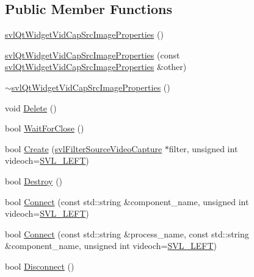 \subsection*{Public Member Functions}
\begin{DoxyCompactItemize}
\item 
\hyperlink{classsvl_qt_widget_vid_cap_src_image_properties_a0cb5bc895ddd2c84fbb9034f84c87028}{svl\-Qt\-Widget\-Vid\-Cap\-Src\-Image\-Properties} ()
\item 
\hyperlink{classsvl_qt_widget_vid_cap_src_image_properties_a8605cbcf1352874760d179154a6cef56}{svl\-Qt\-Widget\-Vid\-Cap\-Src\-Image\-Properties} (const \hyperlink{classsvl_qt_widget_vid_cap_src_image_properties}{svl\-Qt\-Widget\-Vid\-Cap\-Src\-Image\-Properties} \&other)
\item 
\hyperlink{classsvl_qt_widget_vid_cap_src_image_properties_a7fab52aa9b9bb3595d320822d1581356}{$\sim$svl\-Qt\-Widget\-Vid\-Cap\-Src\-Image\-Properties} ()
\item 
void \hyperlink{classsvl_qt_widget_vid_cap_src_image_properties_af0ddf53a66bdf0fbb8c36e7e9e13de2f}{Delete} ()
\item 
bool \hyperlink{classsvl_qt_widget_vid_cap_src_image_properties_a1741bc3973dec7677087578553a469fd}{Wait\-For\-Close} ()
\item 
bool \hyperlink{classsvl_qt_widget_vid_cap_src_image_properties_a3c09d4365eb66766c1ea48f2c7fad494}{Create} (\hyperlink{classsvl_filter_source_video_capture}{svl\-Filter\-Source\-Video\-Capture} $\ast$filter, unsigned int videoch=\hyperlink{svl_definitions_8h_ab9fec7615f19c8df2919eebcab0b187f}{S\-V\-L\-\_\-\-L\-E\-F\-T})
\item 
bool \hyperlink{classsvl_qt_widget_vid_cap_src_image_properties_a6da9ed333d5e43397ea8ecbbfa852d6e}{Destroy} ()
\item 
bool \hyperlink{classsvl_qt_widget_vid_cap_src_image_properties_aaaf4b33ea35a127de6ff9f97e67af14a}{Connect} (const std\-::string \&component\-\_\-name, unsigned int videoch=\hyperlink{svl_definitions_8h_ab9fec7615f19c8df2919eebcab0b187f}{S\-V\-L\-\_\-\-L\-E\-F\-T})
\item 
bool \hyperlink{classsvl_qt_widget_vid_cap_src_image_properties_abf7af58acabf230ed8f301f614e7030e}{Connect} (const std\-::string \&process\-\_\-name, const std\-::string \&component\-\_\-name, unsigned int videoch=\hyperlink{svl_definitions_8h_ab9fec7615f19c8df2919eebcab0b187f}{S\-V\-L\-\_\-\-L\-E\-F\-T})
\item 
bool \hyperlink{classsvl_qt_widget_vid_cap_src_image_properties_a05fe65bf6e08caa942752f336c4fe8e8}{Disconnect} ()
\end{DoxyCompactItemize}
